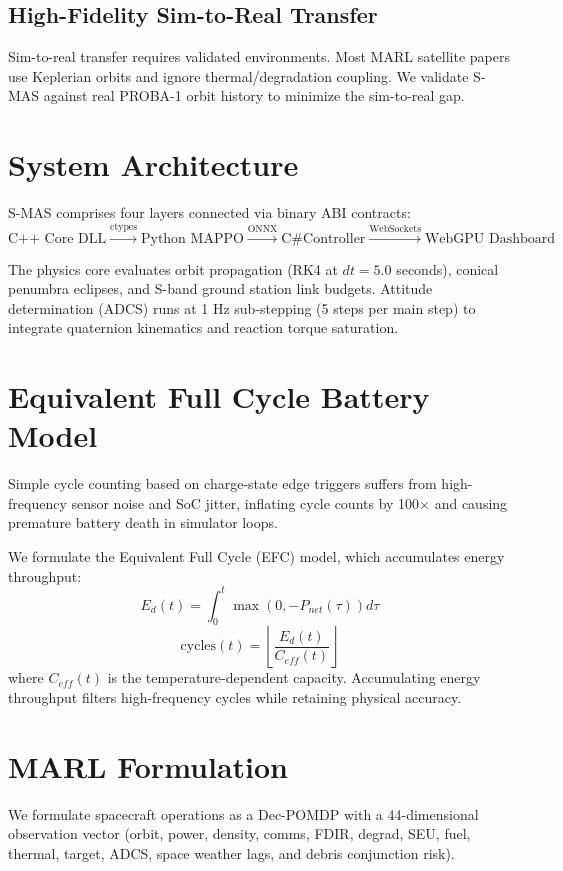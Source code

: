 \documentclass[conference]{IEEEtran}
\begin{document}
\subsection{High-Fidelity Sim-to-Real Transfer}
Sim-to-real transfer requires validated environments. Most MARL satellite papers use Keplerian orbits and ignore thermal/degradation coupling. We validate S-MAS against real PROBA-1 orbit history to minimize the sim-to-real gap.

\section{System Architecture}
S-MAS comprises four layers connected via binary ABI contracts:
$$ \text{C++ Core DLL} \xrightarrow{\text{ctypes}} \text{Python MAPPO} \xrightarrow{\text{ONNX}} \text{C\# Controller} \xrightarrow{\text{WebSockets}} \text{WebGPU Dashboard} $$

The physics core evaluates orbit propagation (RK4 at $dt = 5.0$ seconds), conical penumbra eclipses, and S-band ground station link budgets. Attitude determination (ADCS) runs at 1 Hz sub-stepping (5 steps per main step) to integrate quaternion kinematics and reaction torque saturation.

\section{Equivalent Full Cycle Battery Model}
Simple cycle counting based on charge-state edge triggers suffers from high-frequency sensor noise and SoC jitter, inflating cycle counts by 100$\times$ and causing premature battery death in simulator loops.

We formulate the Equivalent Full Cycle (EFC) model, which accumulates energy throughput:
$$ E_d(t) = \int_0^t \max(0, -P_{net}(\tau)) d\tau $$
$$ \text{cycles}(t) = \left\lfloor \frac{E_d(t)}{C_{eff}(t)} \right\rfloor $$
where $C_{eff}(t)$ is the temperature-dependent capacity. Accumulating energy throughput filters high-frequency cycles while retaining physical accuracy.

\section{MARL Formulation}
We formulate spacecraft operations as a Dec-POMDP with a 44-dimensional observation vector (orbit, power, density, comms, FDIR, degrad, SEU, fuel, thermal, target, ADCS, space weather lags, and debris conjunction risk).
\end{document}
